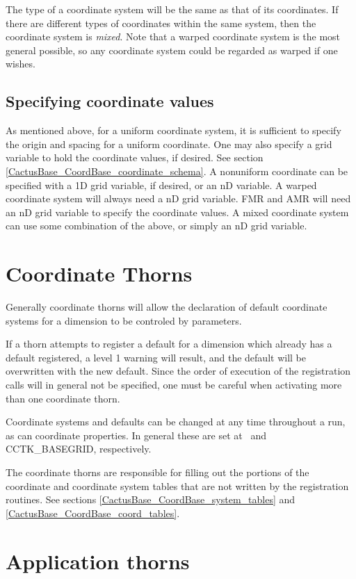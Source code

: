 The type of a coordinate system will be the same as that of its
coordinates.  If there are different types of coordinates within the
same system, then the coordinate system is \emph{mixed}.  Note that a
warped coordinate system is the most general possible, so any
coordinate system could be regarded as warped if one wishes.

\subsection{Specifying coordinate values}

As mentioned above, for a uniform coordinate system, it is sufficient
to specify the origin and spacing for a uniform coordinate.  One may
also specify a grid variable to hold the coordinate values, if
desired.  See section \ref{CactusBase_CoordBase_coordinate_schema}.  A
nonuniform coordinate can be specified with a 1D grid variable, if
desired, or an nD variable.  A warped coordinate system will always
need a nD grid variable.  FMR and AMR will need an nD grid
variable to specify the coordinate values.  A mixed coordinate system
can use some combination of the above, or simply an nD grid variable.


\section{Coordinate Thorns}

Generally coordinate thorns will allow the declaration of default
coordinate systems for a dimension to be controled by parameters.

If a thorn attempts to register a default for a dimension which
already has a default registered, a level 1 warning will result, and
the default will be overwritten with the new default.  Since the order
of execution of the registration calls will in general not be
specified, one must be careful when activating more than one coordinate thorn.

Coordinate systems and defaults can be changed at any time throughout
a run, as can coordinate properties.
In general these are set at \WRAGH\ and CCTK\_BASEGRID, respectively.

The coordinate thorns are responsible for filling out the portions of
the coordinate and coordinate system tables that are not written by
the registration routines.  See sections
\ref{CactusBase_CoordBase_system_tables} and
\ref{CactusBase_CoordBase_coord_tables}.

\section{Application thorns}

